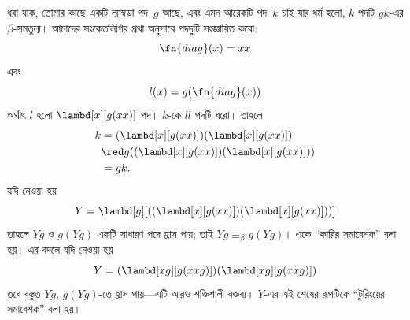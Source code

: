 \documentclass[../../../include/open-logic-section]{subfiles}
\begin{document}

ধরা যাক, তোমার কাছে একটি ল্যাম্বডা পদ~$g$ আছে, এবং এমন আরেকটি পদ~$k$
চাই যার ধর্ম হলো, $k$ পদটি $gk$-এর $\beta$-সমতুল্য। আমাদের সংকেতলিপির
প্রথা অনুসারে পদদুটি সংজ্ঞায়িত করো:
\[
\fn{diag}(x) = xx
\]
এবং
\[
l(x) = g(\fn{diag}(x))
\]
অর্থাৎ $l$ হলো $\lambd[x][g(xx)]$ পদ। $k$-কে $ll$ পদটি ধরো। তাহলে
\begin{align*}
k & = (\lambd[x][g(xx)])(\lambd[x][g(xx)]) \\
& \red  g((\lambd[x][g(xx)])(\lambd[x][g(xx)])) \\
& = gk.
\end{align*}
যদি নেওয়া হয়
\[
Y = \lambd[g][((\lambd[x][g(xx)])(\lambd[x][g(xx)]))]
\]
তাহলে $Yg$ ও $g(Yg)$ একটি সাধারণ পদে হ্রাস পায়; তাই $Yg \equiv_\beta
g(Yg)$। একে ``কারির সমাবেশক'' বলা হয়। এর বদলে যদি নেওয়া হয়
\[
Y = (\lambd[xg][g(xxg)])(\lambd[xg][g(xxg)])
\]
তবে বস্তুত $Yg$, $g(Yg)$-তে হ্রাস পায়—এটি আরও শক্তিশালী বক্তব্য।
$Y$-এর এই শেষের রূপটিকে ``টুরিংয়ের সমাবেশক'' বলা হয়।
\end{document}
